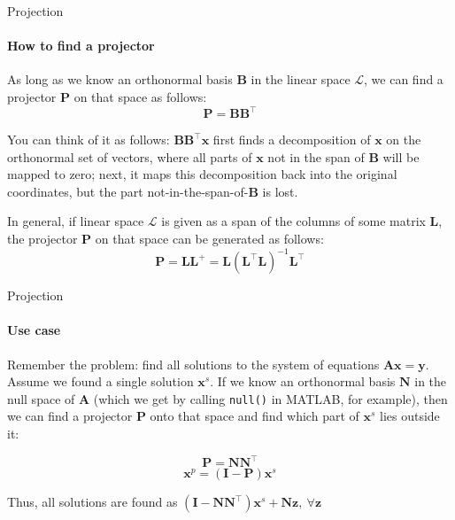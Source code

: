 \documentclass{beamer}
\begin{document}
\begin{frame}{Projection}
\framesubtitle{How to find a projector}
\begin{flushleft}

As long as we know an orthonormal basis $\mathbf{B}$ in the linear space $\mathcal{L}$, we can find a projector $\mathbf{P}$ on that space as follows:
%
\begin{equation}
    \mathbf{P} = \mathbf{B} \mathbf{B}^\top
\end{equation}

You can think of it as follows: $\mathbf{B} \mathbf{B}^\top \mathbf{x}$ first finds a decomposition of $\mathbf{x}$ on the orthonormal set of vectors, where all parts of $\mathbf{x}$ not in the span of $\mathbf{B}$ will be mapped to zero; next, it maps this decomposition back into the original coordinates, but the part not-in-the-span-of-$\mathbf{B}$ is lost.

\bigskip

In general, if linear space $\mathcal{L}$ is given as a span of the columns of some matrix $\mathbf{L}$, the projector $\mathbf{P}$ on that space can be generated as follows:
%
\begin{equation}
    \mathbf{P} = \mathbf{L} \mathbf{L}^+ = \mathbf{L} (\mathbf{L}^\top \mathbf{L})^{-1} \mathbf{L}^\top
\end{equation}

\end{flushleft}
\end{frame}


\begin{frame}{Projection}
\framesubtitle{Use case}
\begin{flushleft}

Remember the problem: find all solutions to the system of equations $\mathbf{A} \mathbf{x} = \mathbf{y}$. Assume we found a single solution $\mathbf{x}^s$. If we know an orthonormal basis $\mathbf{N}$ in the null space of $\mathbf{A}$ (which we get by calling \texttt{null()} in MATLAB, for example), then we can find a projector $\mathbf{P}$ onto that space and find which part of $\mathbf{x}^s$ lies outside it:

\begin{equation}
\mathbf{P} = \mathbf{N} \mathbf{N}^\top
\end{equation}
\begin{equation}
\mathbf{x}^p = (\mathbf{I} - \mathbf{P}) \mathbf{x}^s
\end{equation}

Thus, all solutions are found as $(\mathbf{I} - \mathbf{N} \mathbf{N}^\top) \mathbf{x}^s + \mathbf{N}\mathbf{z}, \ \forall \mathbf{z}$

\end{flushleft}
\end{frame}
\end{document}
